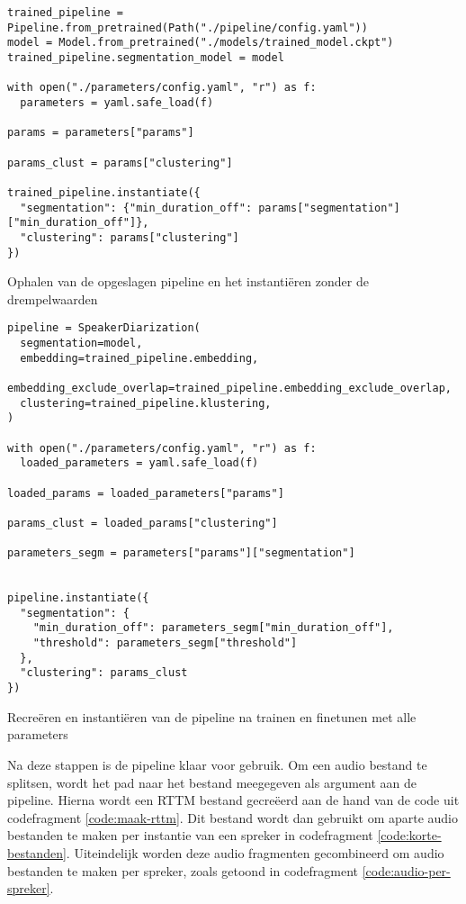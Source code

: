\begin{listing}
	\begin{verbatim}
trained_pipeline = Pipeline.from_pretrained(Path("./pipeline/config.yaml"))
model = Model.from_pretrained("./models/trained_model.ckpt")
trained_pipeline.segmentation_model = model

with open("./parameters/config.yaml", "r") as f:
  parameters = yaml.safe_load(f)

params = parameters["params"]

params_clust = params["clustering"]

trained_pipeline.instantiate({
  "segmentation": {"min_duration_off": params["segmentation"]["min_duration_off"]},
  "clustering": params["clustering"]
})
	\end{verbatim}
	\caption[Ophalen en instantiëren opgeslagen pipeline]{\label{code:eerste-stap}Ophalen van de opgeslagen pipeline en het instantiëren zonder de drempelwaarden}
\end{listing}

\begin{listing}
	\begin{verbatim}
pipeline = SpeakerDiarization(
  segmentation=model,
  embedding=trained_pipeline.embedding,
  embedding_exclude_overlap=trained_pipeline.embedding_exclude_overlap,
  clustering=trained_pipeline.klustering,
)

with open("./parameters/config.yaml", "r") as f:
  loaded_parameters = yaml.safe_load(f)

loaded_params = loaded_parameters["params"]

params_clust = loaded_params["clustering"]

parameters_segm = parameters["params"]["segmentation"]


pipeline.instantiate({
  "segmentation": {
    "min_duration_off": parameters_segm["min_duration_off"],
    "threshold": parameters_segm["threshold"]
  },
  "clustering": params_clust
})
	\end{verbatim}
	\caption[Recreëren van de getrainde pipeline met alle parameters]{\label{code:tweede-stap}Recreëren en instantiëren van de pipeline na trainen en finetunen met alle parameters}
\end{listing}

Na deze stappen is de pipeline klaar voor gebruik. Om een audio bestand te splitsen, wordt het pad naar het bestand meegegeven als argument aan de pipeline. Hierna wordt een RTTM bestand gecreëerd aan de hand van de code uit codefragment \ref{code:maak-rttm}. Dit bestand wordt dan gebruikt om aparte audio bestanden te maken per instantie van een spreker in codefragment \ref{code:korte-bestanden}. Uiteindelijk worden deze audio fragmenten gecombineerd om audio bestanden te maken per spreker, zoals getoond in codefragment \ref{code:audio-per-spreker}.

